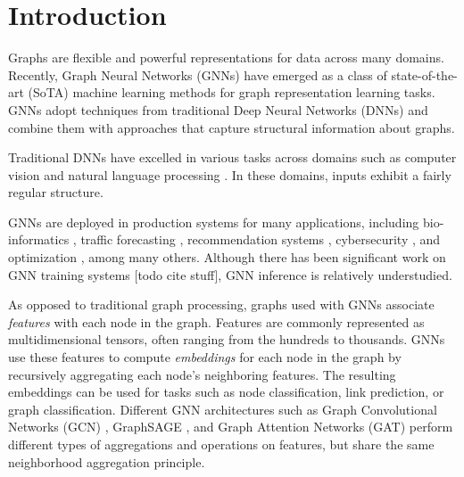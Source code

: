 \chapter{Introduction}


 
Graphs are flexible and powerful representations for data across many domains. Recently, Graph Neural Networks (GNNs) have emerged as a class of state-of-the-art (SoTA) machine learning methods for graph representation learning tasks. GNNs adopt techniques from traditional Deep Neural Networks (DNNs) and combine them with approaches that capture structural information about graphs.

Traditional DNNs have excelled in various tasks across domains such as computer vision \cite{AlexNet_2012}\cite{YOLO_2016} and natural language processing \cite{RNN_2013}\cite{NamedEntityRecognition_2016}. In these domains, inputs exhibit a fairly regular structure.

GNNs are deployed in production systems for many applications, including bio-informatics \cite{Bioinfo_2021} \cite{Bioinfo_2022}, 
traffic forecasting \cite{Traffic_SST-GNN_2021} \cite{Traffic_GoogleMaps_2021} \cite{Traffic_survey_2021}, recommendation systems \cite{Recsys_PinSAGE_2018}\cite{Recsys_Diffnet_2022}\cite{Recsys_LightGCN_2020}\cite{Recsys_NAGCN_2020}\cite{Recsys_SGL_2021}\cite{Recsys_Survey_2022}, 
cybersecurity \cite{Cybersec_2022} \cite{Cybersec_2023}, and optimization \cite{CombinatorialOptimization_2019}\cite{CombinatorialOptimization_2021}, among many others. Although there has been significant work on GNN training systems [todo cite stuff], GNN inference is relatively understudied. 

As opposed to traditional graph processing, graphs used with GNNs associate \textit{features} with each node in the graph. 
Features are commonly represented as multidimensional tensors, often ranging from the hundreds to thousands. GNNs use these features to compute \textit{embeddings} for each node in the graph by recursively aggregating each node's neighboring features. 
The resulting embeddings can be used for tasks such as node classification, link prediction, or graph classification.
Different GNN architectures such as Graph Convolutional Networks (GCN) \cite{GCN_2016}, GraphSAGE \cite{GraphSAGE_2017}, and Graph Attention Networks (GAT) \cite{GAT_2018} perform different types of aggregations and operations on features, but share the same neighborhood aggregation principle.





